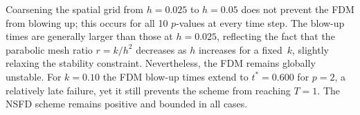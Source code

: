 \documentclass[final,12pt,3p]{elsarticle}
\theoremstyle{plain}
\theoremstyle{definition}
\theoremstyle{remark}
\newcommand{\good}[1]{\textcolor{OliveGreen}{\textbf{#1}}}
\newcommand{\bad}[1]{\textcolor{BrickRed}{#1}}
\begin{document}
Coarsening the spatial grid from $h = 0.025$ to $h = 0.05$ does not prevent the FDM from blowing up; this occurs for all 10 $p$-values at every time step.
The blow-up times are generally larger than those at $h = 0.025$, reflecting the fact that the parabolic mesh ratio $r = k/h^2$ decreases as $h$ increases for a fixed~$k$, slightly relaxing the stability constraint.
Nevertheless, the FDM remains globally unstable.
For $k = 0.10$ the FDM blow-up times extend to $t^* = 0.600$ for $p = 2$, a relatively late failure, yet it still prevents the scheme from reaching $T = 1$.
The NSFD scheme remains positive and bounded in all cases.

\end{document}

